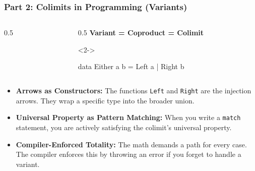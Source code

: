 \documentclass[11pt,t,usepdftitle=false,aspectratio=169]{beamer}
\begin{document}
\begin{frame}[fragile]
\frametitle{Part 2: Colimits in Programming (Variants)}

  \begin{columns}[c]
    \begin{column}{0.5\textwidth}
      \centering
    \end{column}
    \begin{column}{0.5\textwidth}
      \textbf{Variant = Coproduct = Colimit}
      
      \medskip
      \begin{uncoverenv}<2->
      \begin{semiverbatim}\scriptsize
data Either a b
  = Left a
  | Right b
      \end{semiverbatim}
      \end{uncoverenv}
    \end{column}
  \end{columns}

  \vspace{0.3cm}
  \begin{itemize}
    \item<3-> \textbf{Arrows as Constructors:} The functions \texttt{Left} and \texttt{Right} are the injection arrows. They wrap a specific type into the broader union.
    \item<4-> \textbf{Universal Property as Pattern Matching:} When you write a \texttt{match} statement, you are actively satisfying the colimit's universal property.
    \item<5-> \textbf{Compiler-Enforced Totality:} The math demands a path for every case. The compiler enforces this by throwing an error if you forget to handle a variant.
  \end{itemize}
\end{frame}
\end{document}
